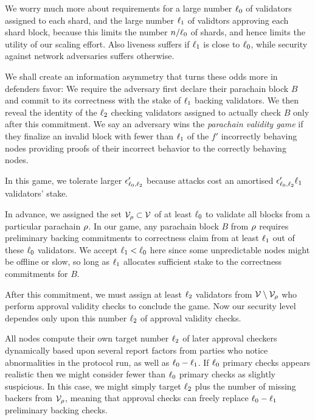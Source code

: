 We worry much more about requirements for a large number $\ell_0$ of validators assigned to each shard, and the large number $\ell_1$ of validtors approving each shard block, because this limits the number $n/\ell_0$ of shards, and hence limits the utility of our scaling effort.  Also liveness suffers if $\ell_1$ is close to $\ell_0$, while security against network adversaries suffers otherwise.

We shall create an information asymmetry that turns these odds more in defenders favor: 
We require the adversary first declare their parachain block $B$ and commit to its correctness with the stake of $\ell_1$ backing validators.  We then reveal the identity of the $\ell_2$ checking validators assigned to actually check $B$ only after this commitment.  We say an adversary wins the {\em parachain validity game} if they finalize an invalid block with fewer than $\ell_1$ of the $f'$ incorrectly behaving nodes providing proofs of their incorrect behavior to the correctly behaving nodes. 

In this game, we tolerate larger $\epsilon'_{\ell_0,\ell_2}$ because attacks cost an amortised $\epsilon'_{\ell_0,\ell_2} \ell_1$ validators' stake. 

In advance, we assigned the set $\mathcal{V}_{\rho} \subset \mathcal{V}$ of at least $\ell_0$ to validate all blocks from a particular parachain $\rho$.  
In our game, any parachain block $B$ from $\rho$ requires preliminary backing commitments to correctness claim from at least $\ell_1$ out of these $\ell_0$ validators.  We accept $\ell_1 < \ell_0$ here since some unpredictable nodes might be offline or slow, so long as $\ell_1$ allocates sufficient stake to the correctness commitments for $B$.  


After this commitment, we must assign at least $\ell_2$ validators from $\mathcal{V} \setminus \mathcal{V}_{\rho}$ who perform approval validity checks to conclude the game.  Now our security level dependes only upon this number $\ell_2$ of approval validity checks.  

All nodes compute their own target number $\ell_2$ of later approval checkers dynamically based upon several report factors from parties who notice abnormalities in the protocol run, as well as $\ell_0-\ell_1$.  If $\ell_0$ primary checks appears realistic then we might consider fewer than $\ell_0$ primary checks as slightly suspicious.  In this case, we might simply target $\ell_2$ plus the number of missing backers from $\mathcal{V}_{\rho}$, meaning that approval checks can freely replace $\ell_0-\ell_1$ preliminary backing checks.  



